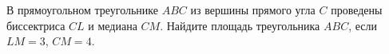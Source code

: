 \begin{ex}
	\begin{condition}
		В прямоугольном треугольнике \( ABC  \) из вершины прямого угла \( C  \) проведены биссектриса \( CL  \) и медиана \( CM \). Найдите площадь треугольника \( ABC \), если \( LM=3\), \( CM=4 \).
	\end{condition}
\end{ex}